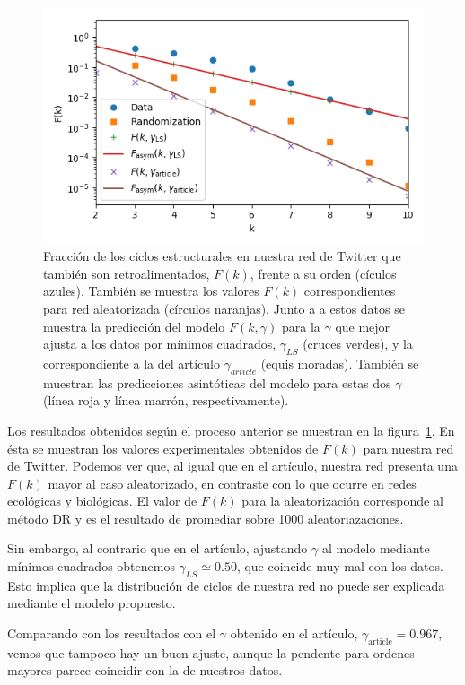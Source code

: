 \documentclass[1p]{elsarticle}
\begin{document}
\begin{figure}
    \centering
    \includegraphics[width=0.5\paperwidth]{F_sevaseviene.png}
    \caption{Fracción de los ciclos estructurales en nuestra red de Twitter que también son retroalimentados, $F(k)$, frente a su orden (cículos azules). También se muestra los valores $F(k)$ correspondientes para red aleatorizada (círculos naranjas). Junto a a estos datos se muestra la predicción del modelo $F(k, \gamma)$ para la $\gamma$ que mejor ajusta a los datos por mínimos cuadrados, $\gamma_{LS}$ (cruces verdes), y la correspondiente a la del artículo $\gamma_{article}$ (equis moradas). También se muestran las predicciones asintóticas del modelo para estas dos $\gamma$ (línea roja y línea marrón, respectivamente).}
    \label{fig:sevaseviene_F}
\end{figure}

    Los resultados obtenidos según el proceso anterior se muestran en la figura~\ref{fig:sevaseviene_F}.
    En ésta se muestran los valores experimentales obtenidos de $F(k)$ para nuestra red de Twitter. 
    Podemos ver que, al igual que en el artículo, nuestra red presenta una $F(k)$ mayor al caso aleatorizado, en contraste con lo que ocurre en redes ecológicas y biológicas. 
    El valor de $F(k)$ para la aleatorización corresponde al método DR y es el resultado de promediar sobre 1000 aleatoriazaciones.

    Sin embargo, al contrario que en el artículo, ajustando $\gamma$ al modelo mediante mínimos cuadrados obtenemos $\gamma_{LS} \simeq 0.50$, que coincide muy mal con los datos.
    Esto implica que la distribución de ciclos de nuestra red no puede ser explicada mediante el modelo propuesto.

    Comparando con los resultados con el $\gamma$ obtenido en el artículo, $\gamma_{\textrm{article}} = 0.967$, vemos que tampoco hay un buen ajuste, aunque la pendente para ordenes mayores parece coincidir con la de nuestros datos.
\end{document}
